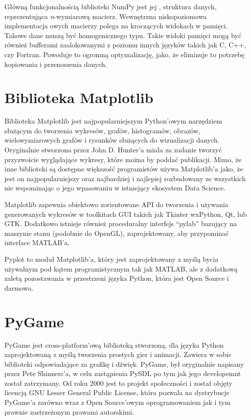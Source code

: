 Główną funkcjonalnością biblioteki NumPy jest jej , struktura danych, reprezentująca \textit{n}-wymiarową macierz. Wewnętrzna niskopoziomowa implementacja owych macierzy polega na kroczących widokach w pamięci. Takowe dane muszą być homogenicznego typu. Takie widoki pamięci mogą być również bufferami zaalokowanymi z poziomu innych języków takich jak C, C++, czy Fortran. Powoduje to ogromną optymalizację, jako, że eliminuje to potrzebę kopiowania i przenoszenia danych.



\section{Biblioteka Matplotlib}

Biblioteka Matplotlib \cite{MatplotlibDocumentation} \cite{Matplotlib30Cookbook} \cite{PythonForDataAnalysis} \cite{WikipediaMatplotlib} jest najpopularniejszym Python'owym narzędziem służącym do tworzenia wykresów, grafów, histogramów, obrazów, wielowymiarowych grafów i rysunków służących do wizualizacji danych. Oryginalnie stworzona przez John D. Hunter'a miała za zadanie tworzyć przyzwoicie wyglądające wykresy, które można by poddać publikacji. Mimo, że inne biblioteki są dostępne większość programistów używa Matplotlib'a jako, że jest on najpopularniejszy oraz najbardziej i najlepiej rozbudowany ze wszystkich nie wspominając o jego wpasowaniu w istniejący ekosystem Data Science.

Matplotlib zapewnia obiektowo zorientowane API do tworzenia i używania generowanych wykresów w toolkitach GUI takich jak Tkinter wxPython, Qt, lub GTK. Dodatkowo istnieje również proceduralny interfejs ``pylab'' bazujący na maszynie stanu (podobnie do OpenGL), zaprojektowany, aby przypominać interface MATLAB'a.

Pyplot to moduł Matplotlib'a, który jest zaprojektowany z myślą bycia używalnym pod kątem programistycznym tak jak MATLAB, ale z dodatkową zaletą pozostawania w przestrzeni języka Python, która jest Open Source i darmowa.


\section{PyGame}

PyGame \cite{PyGameDocumentation} \cite{WikipediaPyGame} jest cross-platform'ową biblioteką stworzoną, dla języka Python zaprojektowaną z myślą tworzenia prostych gier i animacji. Zawiera w sobie biblioteki odpowiadające za grafikę i dźwięk.
PyGame, był oryginalnie napisany przez Pete Shinners'a, w celu zastąpienia PySDL po tym jak jego developemnt został zatrzymany. Od roku 2000 jest to projekt społeczności i został objęty licencją GNU Lesser General Public License, która pozwala na dystrybucje PyGame'a zarówno wraz z Open Source'owym oprogramowaniem jak i tym prawnie zastrzeżonym prawami autorskimi.




